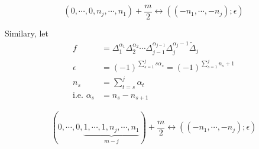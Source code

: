 \documentclass[12pt]{amsart}
\def\tDelta{\widetilde{\Delta}}
\begin{document}
\[
(0,\cdots, 0, n_j, \cdots, n_1)+\frac{m}{2}
\leftrightarrow
((-n_1, \cdots, -n_j); \epsilon)
\]

Similary, let
\begin{align*}
f &= \Delta_1^{\alpha_1}\Delta_2^{\alpha_2} \cdots \Delta_{j-1}^{\alpha_{j-1}}\Delta_j^{\alpha_j-1}\tDelta_j\\
\epsilon &= (-1)^{\sum_{s=1}^j s\alpha_s} = (-1)^{\sum_{s=1}^j n_s+1}\\
n_s &= \sum_{t=s}^j \alpha_t\\
\text{i.e. } \alpha_s &= n_s-n_{s+1}
\end{align*}

\[
(0,\cdots, 0,\underbrace{1, \cdots, 1, n_j, \cdots, n_1}_{m-j})+\frac{m}{2}
\leftrightarrow
((-n_1, \cdots, -n_j); \epsilon)
\]

{}

\end{document}
